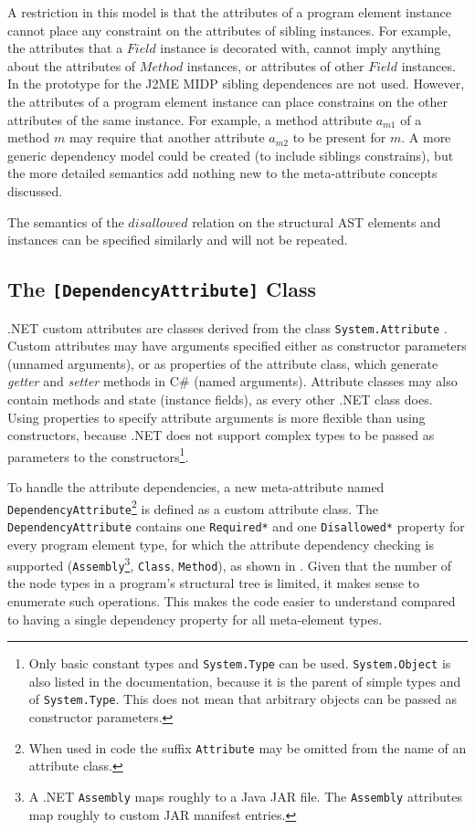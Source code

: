 A restriction in this model is that the attributes of a program element instance cannot place any constraint on the attributes of sibling instances. For example, the attributes that a $Field$ instance is decorated with, cannot imply anything about the attributes of $Method$ instances, or attributes of other $Field$ instances. In the prototype for the J2ME MIDP  sibling dependences are not used. However, the attributes of a program element instance can place constrains on the other attributes of the same instance. For example, a method attribute $a_{m1}$ of a method $m$ may require that another attribute $a_{m2}$ to be present for $m$. A more generic dependency model could be created (to include siblings constrains), but the more detailed semantics add nothing new to the meta-attribute concepts discussed.

The semantics of the $disallowed$ relation on the structural AST elements and instances can be specified similarly and will not be repeated.

\subsection{The \texttt{[DependencyAttribute]} Class}

.NET custom attributes are classes derived from the class \texttt{Sy\-stem.Attri\-bu\-te} . Custom attributes may have arguments specified either as constructor parameters (unnamed arguments), or as properties of the attribute class, which generate \textit{getter} and \textit{setter} methods in C\# (named arguments). Attribute classes may also contain methods and state (instance fields), as every other .NET class does.
Using properties to specify attribute arguments is more flexible than using constructors, because .NET does not support complex types to be passed as parameters to the constructors\footnote{Only basic constant types and \texttt{Sy\-stem.Ty\-pe} can be used. \texttt{Sy\-stem.\-Object} is also listed in the documentation, because it is the parent of simple types and of \texttt{Sy\-stem.Ty\-pe}. This does not mean that arbitrary objects can be passed as constructor parameters.}. 

To handle the attribute dependencies, a new meta-attribute named  \texttt{De\-pen\-dency\-Attri\-bu\-te}\footnote{When used in code the suffix \texttt{Attri\-bu\-te} may be omitted from the name of an attribute class.} is defined as a custom attribute class. The \texttt{De\-pen\-dency\-Attri\-bu\-te} contains one \texttt{Re\-quired*} and one \texttt{Dis\-allowed*} property for every program element type, for which the attribute dependency checking is supported (\texttt{Assembly}\footnote{A .NET \texttt{Assembly} maps roughly to a Java JAR file. The \texttt{Assembly} attributes map roughly to custom JAR manifest entries.}, \texttt{Class}, \texttt{Me\-thod}), as shown in . 
Given that the number of the node types in a program's structural tree is limited, it makes sense to enumerate such operations. This makes the code easier to understand compared to having a single dependency property for all meta-element types.

